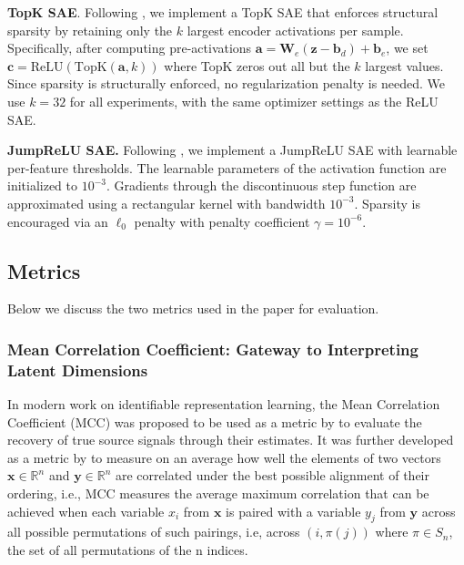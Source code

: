 \documentclass{article}
\newcommand{\x}{\mathbf{x}}
\begin{document}
\textbf{TopK SAE}. Following \citet{gao2024scaling}, we implement a TopK SAE that
  enforces structural sparsity by retaining only the $k$ largest encoder
  activations per sample. Specifically, after computing pre-activations
  $\mathbf{a} = \mathbf{W}_e (\mathbf{z} - \mathbf{b}_d) + \mathbf{b}_e$, we
  set $\mathbf{c} = \text{ReLU}(\text{TopK}(\mathbf{a}, k))$ where TopK zeros
   out all but the $k$ largest values. Since sparsity is structurally
  enforced, no regularization penalty is needed. We use $k =
  32$ for all experiments, with the same optimizer settings as the ReLU SAE.

\textbf{JumpReLU SAE.} Following \citet{rajamanoharan2024improvingdictionarylearninggated}, we implement a
  JumpReLU SAE with learnable per-feature thresholds. The learnable parameters of the activation function
   are initialized to $10^{-3}$. Gradients through the discontinuous step function
   are approximated using a rectangular kernel with bandwidth $10^{-3}$.
  Sparsity is encouraged via an $\ell_0$ penalty
  with penalty coefficient $\gamma = 10^{-6}$.

\subsection{Metrics}
\label{apx:metrics}
Below we discuss the two metrics used in the paper for evaluation.
\subsubsection{Mean Correlation Coefficient: Gateway to Interpreting Latent Dimensions}
\label{apx:mcc}

In modern work on identifiable representation learning, the Mean Correlation Coefficient (MCC) was proposed to be used as a metric by \citet{hyvarinen2016unsupervisedfeatureextractiontimecontrastive} to evaluate the recovery of true source signals through their estimates. It was further developed as a metric by \citet{khemakhem2020icebeemidentifiableconditionalenergybased} to measure on an average how well the elements of two vectors $\x \in \mathbb{R}^n$ and $\mathbf{y} \in \mathbb{R}^n$ are correlated under the best possible alignment of their ordering, i.e., MCC measures the average maximum correlation that can be achieved when each variable $x_i$ from $\x$ is paired with a variable $y_j$ from $\mathbf{y}$ across all possible permutations of such pairings, i.e, across $(i, \pi(j))$ where $\pi \in S_n$, the set of all permutations of the n indices.
\end{document}
